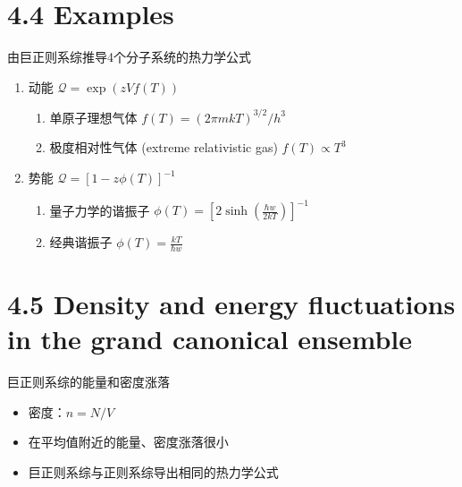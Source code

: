 \documentclass{ctexbeamer}
\begin{document}
\section{4.4 Examples}
\begin{frame}{由巨正则系综推导4个分子系统的热力学公式}
    \begin{enumerate}
        \item 动能 $\mathcal{Q} = \exp(zVf(T))$
        \begin{enumerate}
            \item 单原子理想气体 $f(T) = (2\pi m kT)^{3/2}/h^3$
            \item 极度相对性气体 (extreme relativistic gas)
            $f(T) \propto T^3 $
        \end{enumerate}
        \item 势能 $\mathcal{Q} = [1-z\phi(T)]^{-1}$
        \begin{enumerate}
            \item 量子力学的谐振子 $\phi(T)=[2\sinh(\frac{\hbar w}{2kT})]^{-1}$
            \item 经典谐振子 $ \phi(T) = \frac{kT}{\hbar w}$
        \end{enumerate}
    \end{enumerate}
\end{frame}
\section{4.5 Density and energy fluctuations in the grand canonical ensemble}
\begin{frame}{巨正则系综的能量和密度涨落}
    \begin{itemize}
        \item 密度：$n=N/V$
        \item 在平均值附近的能量、密度涨落很小
        \item 巨正则系综与正则系综导出相同的热力学公式
    \end{itemize}
\end{frame}
\end{document}
